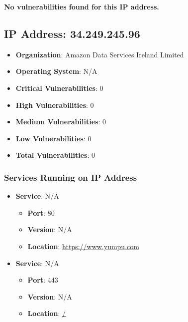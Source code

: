 \documentclass{article}
\begin{document}
\textbf{No vulnerabilities found for this IP address.}




\clearpage



\subsection{IP Address: 34.249.245.96}

\begin{itemize}
    \item \textbf{Organization}: Amazon Data Services Ireland Limited
    \item \textbf{Operating System}:  N/A 
    \item \textbf{Critical Vulnerabilities}: 0
    \item \textbf{High Vulnerabilities}: 0
    \item \textbf{Medium Vulnerabilities}: 0
    \item \textbf{Low Vulnerabilities}: 0
    \item \textbf{Total Vulnerabilities}: 0
\end{itemize}

\subsubsection*{Services Running on IP Address}

\begin{itemize}
    
        \item \textbf{Service}: N/A
        \begin{itemize}
            \item \textbf{Port}: 80
            \item \textbf{Version}:  N/A 
            \item \textbf{Location}: \href{ https://www.yumpu.com }{ https://www.yumpu.com }
        \end{itemize}
    
        \item \textbf{Service}: N/A
        \begin{itemize}
            \item \textbf{Port}: 443
            \item \textbf{Version}:  N/A 
            \item \textbf{Location}: \href{ / }{ / }
        \end{itemize}
    
\end{itemize}
\end{document}
